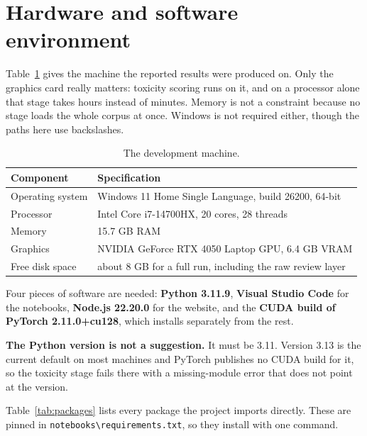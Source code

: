 \section{Hardware and software environment}
\label{sec:hardware}

Table~\ref{tab:hardware} gives the machine the reported results were produced on. Only the graphics
card really matters: toxicity scoring runs on it, and on a processor alone that stage takes hours
instead of minutes. Memory is not a constraint because no stage loads the whole corpus at once.
Windows is not required either, though the paths here use backslashes.

\begin{table}[htbp]
\centering
\caption{The development machine.}
\label{tab:hardware}
\small
\begin{tabular}{|p{4.0cm}|p{10.0cm}|}
\hline
\textbf{Component} & \textbf{Specification} \\
\hline
Operating system & Windows 11 Home Single Language, build 26200, 64-bit \\
\hline
Processor & Intel Core i7-14700HX, 20 cores, 28 threads \\
\hline
Memory & 15.7 GB RAM \\
\hline
Graphics & NVIDIA GeForce RTX 4050 Laptop GPU, 6.4 GB VRAM \\
\hline
Free disk space & about 8 GB for a full run, including the raw review layer \\
\hline
\end{tabular}
\end{table}


Four pieces of software are needed: \textbf{Python 3.11.9}, \textbf{Visual Studio Code} for the
notebooks, \textbf{Node.js 22.20.0} for the website, and the \textbf{CUDA build of PyTorch
2.11.0+cu128}, which installs separately from the rest.

\textbf{The Python version is not a suggestion.} It must be 3.11. Version 3.13 is the current
default on most machines and PyTorch publishes no CUDA build for it, so the toxicity stage fails
there with a missing-module error that does not point at the version.

Table~\ref{tab:packages} lists every package the project imports directly. These are pinned in
\texttt{notebooks\textbackslash requirements.txt}, so they install with one command.

